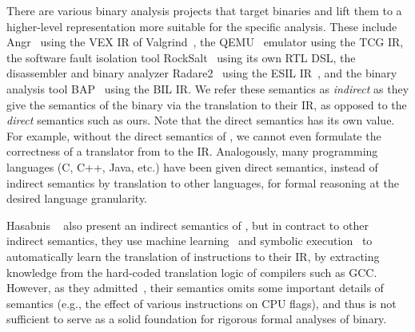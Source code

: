 There are various binary analysis projects that target \ISA binaries
and lift them to a higher-level representation more suitable for the
specific analysis. These include Angr~\cite{Angr} using the VEX IR of Valgrind~\cite{Valgrind:ENTCS03}, the QEMU~\cite{QEMU:USENIX05} emulator
using the TCG IR, the software fault isolation tool RockSalt~\cite{Roclsalt:PLDI12} using its own RTL DSL, the disassembler and binary analyzer Radare2~\cite{Radare2} using the ESIL IR~\cite{ESIL}, and the binary analysis
tool BAP~\cite{BAP:CAV11} using the BIL IR.
We refer these semantics as \emph{indirect} as they give the semantics of the \ISA binary via the translation to their IR, as opposed to the \emph{direct} semantics such as ours.
Note that the direct semantics has its own value.
For example, without the direct semantics of \ISA, we cannot even formulate the correctness of a translator from \ISA to the IR.
Analogously, many programming languages (C, C++, Java, etc.) have been given direct semantics, instead of indirect semantics by translation to other languages, for formal reasoning at the desired language granularity. 






Hasabnis \etal~\cite{Hasabnis:ASPLOS16, Hasabnis:FSE16} also present an indirect semantics of \ISA, but in contract to other indirect semantics, they use machine learning~\cite{Hasabnis:ASPLOS16} and symbolic 
execution~\cite{Hasabnis:FSE16} to automatically learn the translation of \ISA instructions to their IR, by extracting knowledge from the hard-coded  translation logic of compilers such as GCC.
However, as they admitted~\cite{Hasabnis:FSE16}, their semantics omits some important details of \ISA semantics (e.g., the effect of various instructions on CPU flags), and thus is not sufficient to serve as a solid foundation for rigorous formal analyses of \ISA binary.


